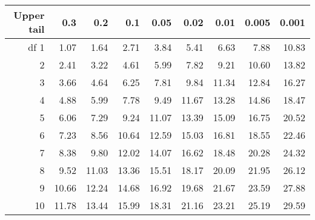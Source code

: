 
\begin{center}
\begin{tabular}{r | rrrr | rrrr |}
  \hline
Upper tail & 0.3 & 0.2 & 0.1 & 0.05 & 0.02 & 0.01 & 0.005 & 0.001 \\ 
  \hline
df \hfill 1 & \footnotesize 1.07 & \footnotesize 1.64 & \footnotesize 2.71 & \footnotesize 3.84 & \footnotesize 5.41 & \footnotesize 6.63 & \footnotesize 7.88 & \footnotesize 10.83 \\ 
  2 & \footnotesize 2.41 & \footnotesize 3.22 & \footnotesize 4.61 & \footnotesize 5.99 & \footnotesize 7.82 & \footnotesize 9.21 & \footnotesize 10.60 & \footnotesize 13.82 \\ 
  3 & \footnotesize 3.66 & \footnotesize 4.64 & \footnotesize 6.25 & \footnotesize 7.81 & \footnotesize 9.84 & \footnotesize 11.34 & \footnotesize 12.84 & \footnotesize 16.27 \\ 
  4 & \footnotesize 4.88 & \footnotesize 5.99 & \footnotesize 7.78 & \footnotesize 9.49 & \footnotesize 11.67 & \footnotesize 13.28 & \footnotesize 14.86 & \footnotesize 18.47 \\ 
  5 & \footnotesize 6.06 & \footnotesize 7.29 & \footnotesize 9.24 & \footnotesize 11.07 & \footnotesize 13.39 & \footnotesize 15.09 & \footnotesize 16.75 & \footnotesize 20.52 \\ 
  \hline
  6 & \footnotesize 7.23 & \footnotesize 8.56 & \footnotesize 10.64 & \footnotesize 12.59 & \footnotesize 15.03 & \footnotesize 16.81 & \footnotesize 18.55 & \footnotesize 22.46 \\ 
  7 & \footnotesize 8.38 & \footnotesize 9.80 & \footnotesize 12.02 & \footnotesize 14.07 & \footnotesize 16.62 & \footnotesize 18.48 & \footnotesize 20.28 & \footnotesize 24.32 \\ 
  8 & \footnotesize 9.52 & \footnotesize 11.03 & \footnotesize 13.36 & \footnotesize 15.51 & \footnotesize 18.17 & \footnotesize 20.09 & \footnotesize 21.95 & \footnotesize 26.12 \\ 
  9 & \footnotesize 10.66 & \footnotesize 12.24 & \footnotesize 14.68 & \footnotesize 16.92 & \footnotesize 19.68 & \footnotesize 21.67 & \footnotesize 23.59 & \footnotesize 27.88 \\ 
  10 & \footnotesize 11.78 & \footnotesize 13.44 & \footnotesize 15.99 & \footnotesize 18.31 & \footnotesize 21.16 & \footnotesize 23.21 & \footnotesize 25.19 & \footnotesize 29.59 \\ 

\end{tabular}
\end{center}
